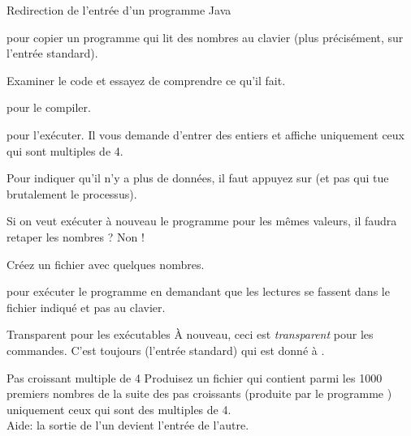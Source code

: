 \documentclass[a4paper,11pt]{style-esi/td}
\begin{document}
		\begin{Experience}{Redirection de l'entrée d'un programme Java}
			\begin{steps}
			\item 
				pour copier un programme  qui lit des nombres
				au clavier (plus précisément, sur l'entrée standard).
			\item 
				Examiner le code et essayez de comprendre ce qu'il fait.
			\item 
				 pour le compiler.
			\item 
				 pour l'exécuter.
				Il vous demande d'entrer des entiers et affiche
				uniquement ceux qui sont multiples de 4.
			\item 
				Pour indiquer qu'il n'y a plus de données,
				il faut appuyez sur 
				(et pas  qui tue brutalement le processus).
			\end{steps}
			Si on veut exécuter à nouveau le programme pour les mêmes valeurs,
			il faudra retaper les nombres ? Non !
			\begin{steps}
			\item 
				Créez un fichier  avec quelques nombres.
			\item 
				 pour exécuter
				le programme en demandant que les lectures se fassent
				dans le fichier indiqué et pas au clavier.
			\end{steps}
		\end{Experience}	

		\medskip
		\begin{alerttbox}{Transparent pour les exécutables}
			À nouveau, ceci est \emph{transparent} pour les commandes.
			C'est toujours  (l'entrée standard) 
			qui est donné à .
		\end{alerttbox}

		\begin{Exercice}{Pas croissant multiple de 4 }
			Produisez un fichier 
			qui contient parmi les 1000 premiers nombres de la suite
			des pas croissants (produite par le programme )
			uniquement ceux qui sont des multiples de 4.
			\\Aide: la sortie de l'un devient l'entrée de l'autre.
		\end{Exercice}
\end{document}

